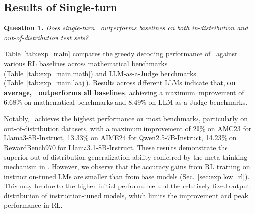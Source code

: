\subsection{Results of Single-turn \method}
\label{sec:exp.single_turn}
\textbf{Question 1.} \textit{Does single-turn \method~outperforms baselines on both in-distribution and out-of-distribution test sets?}

Table~\ref{tab:exp_main} compares the greedy decoding performance of \method~against various RL baselines across mathematical benchmarks (Table~\ref{tab:exp_main.math}) and LLM-as-a-Judge benchmarks (Table~\ref{tab:exp_main.laaj}). Results across different LLMs indicate that, \textbf{on average, \method~outperforms all baselines}, achieving a maximum improvement of 6.68\% on mathematical benchmarks and 8.49\% on LLM-as-a-Judge benchmarks.

Notably, \method~achieves the highest performance on most benchmarks, particularly on out-of-distribution datasets, with a maximum improvement of 20\% on AMC23 for Llama3-8B-Instruct, 13.33\% on AIME24 for Qwen2.5-7B-Instruct, 14.23\% on RewardBench970 for Llama3.1-8B-Instruct. 
These results demonstrate the superior out-of-distribution generalization ability conferred by the meta-thinking mechanism in \method.
However, we observe that the accuracy gains from RL training on instruction-tuned LMs are smaller than from base models (Sec.~\ref{sec:exp.low_rl}).
This may be due to the higher initial performance and the relatively fixed output distribution of instruction-tuned models, which limits the improvement and peak performance in RL.

